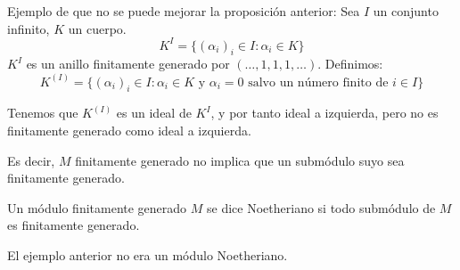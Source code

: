 Ejemplo de que no se puede mejorar la proposición anterior:
Sea \(I\) un conjunto infinito, \(K\) un cuerpo.
\[
  K^I=\{{(\alpha_i)}_i\in I:\alpha_i\in K\}
\]
\(K^I\) es un anillo finitamente generado
por \((\ldots,1,1,1,\ldots)\). Definimos:
\[
  K^{(I)}=\{{(\alpha_i)}_i\in I:\alpha_i\in K \textrm{ y } \alpha_i=0
  \textrm{ salvo un número finito de } i\in I\}
\]

Tenemos que \(K^{(I)}\) es un ideal de \(K^I\), y por tanto ideal a
izquierda, pero no es finitamente generado como ideal a izquierda.

Es decir, \(M\) finitamente generado no implica que un submódulo suyo
sea finitamente generado.

\begin{df}
  Un módulo finitamente generado \(M\) se dice Noetheriano si todo
  submódulo de \(M\) es finitamente generado.
\end{df}

El ejemplo anterior no era un módulo Noetheriano.

